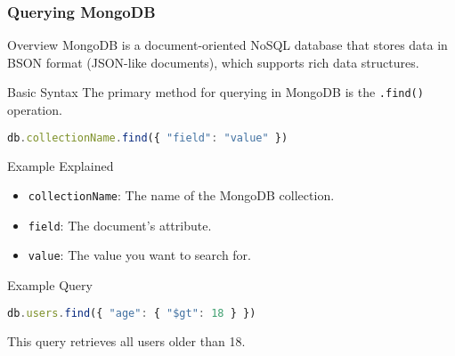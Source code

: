 \documentclass[aspectratio=169]{beamer}
\begin{document}
\begin{frame}[fragile]
    \frametitle{Querying MongoDB}
    \begin{block}{Overview}
        MongoDB is a document-oriented NoSQL database that stores data in BSON format (JSON-like documents), which supports rich data structures.
    \end{block}
    
    \begin{block}{Basic Syntax}
        The primary method for querying in MongoDB is the \texttt{.find()} operation.
    \end{block}
    
    \begin{lstlisting}[language=JavaScript]
db.collectionName.find({ "field": "value" })
    \end{lstlisting}

    \begin{block}{Example Explained}
        \begin{itemize}
            \item \texttt{collectionName}: The name of the MongoDB collection.
            \item \texttt{field}: The document's attribute.
            \item \texttt{value}: The value you want to search for.
        \end{itemize}
    \end{block}
    
    \begin{block}{Example Query}
        \begin{lstlisting}[language=JavaScript]
db.users.find({ "age": { "$gt": 18 } })
        \end{lstlisting}
        This query retrieves all users older than 18.
    \end{block}
\end{frame}
\end{document}
